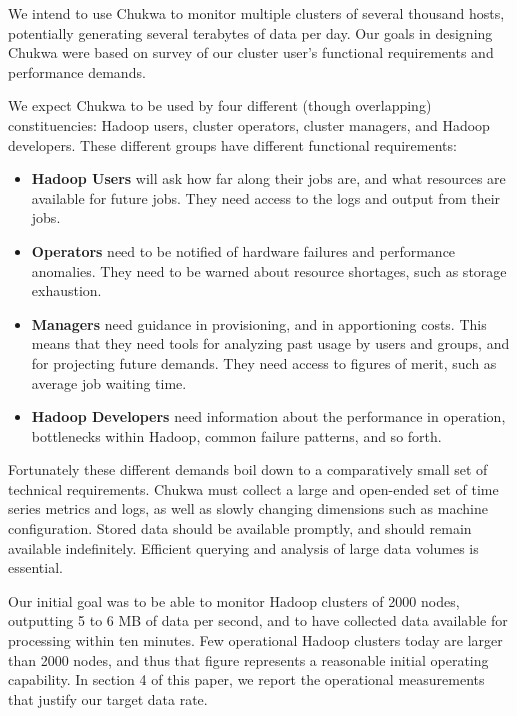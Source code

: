 \documentclass[letterpaper,twocolumn,10pt]{article}
\begin{document}
We intend to use Chukwa to monitor multiple clusters of several thousand hosts, potentially generating several terabytes of data per day. Our goals in designing Chukwa were based on survey of our cluster user's functional requirements and performance demands.

We expect Chukwa to be used by four different (though overlapping) constituencies:  Hadoop users, cluster operators, cluster managers, and Hadoop developers.  These different groups have different functional requirements:

\begin{itemize}
\item \textbf{Hadoop Users} will ask how far along their jobs are, and what resources are available for future jobs. They need access to the logs and output from their jobs.  

\item \textbf{Operators} need to be notified of hardware failures and performance anomalies. They need to be warned about resource shortages, such as storage exhaustion.  

\item \textbf{Managers} need guidance in provisioning, and in apportioning costs. This means that they need tools for analyzing past usage by users and groups, and for projecting future demands.   They need access to figures of merit, such as average job waiting time.

\item \textbf{Hadoop Developers} need information about the performance in operation, bottlenecks within Hadoop, common failure patterns, and so forth.
\end{itemize}

Fortunately these different demands boil down to a comparatively small set of technical requirements.  Chukwa must collect a large and open-ended set of time series metrics and logs, as well as  slowly changing dimensions such as machine configuration.  Stored data should be available promptly, and should remain available indefinitely. Efficient querying and analysis of large data volumes is essential.

Our initial goal was to be able to monitor Hadoop clusters of 2000 nodes, outputting 5 to 6 MB of data per second, and to have collected data available for processing within ten minutes. Few operational Hadoop clusters today are larger than 2000 nodes, and thus that figure represents a reasonable initial operating capability.  In section 4 of this paper, we report the operational measurements that justify our target data rate.
\end{document}
